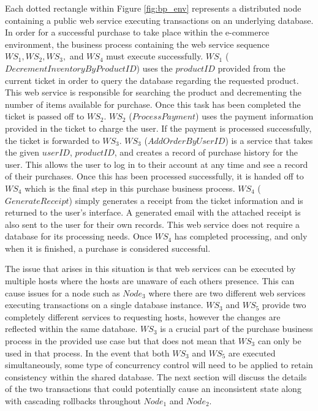 \documentclass[conference]{IEEEtran}
\begin{document}
Each dotted rectangle within Figure \ref{fig:bp_env} represents a distributed node containing a public web service executing transactions on an underlying database. In order for a successful purchase to take place within the e-commerce environment, the business process containing the web service sequence $WS_{1}, WS_{2}, WS_{3},$ and $WS_{4}$ must execute successfully. $WS_{1}$ ($DecrementInventoryByProductID$) uses the $productID$ provided from the current ticket in order to query the database regarding the requested product. This web service is responsible for searching the product and decrementing the number of items available for purchase. Once this task has been completed the ticket is passed off to $WS_{2}$. $WS_{2}$ ($ProcessPayment$) uses the payment information provided in the ticket to charge the user. If the payment is processed successfully, the ticket is forwarded to $WS_{3}$. $WS_{3}$ ($AddOrderByUserID$) is a service that takes the given $userID$, $product ID$, and creates a record of purchase history for the user. This allows the user to log in to their account at any time and see a record of their purchases. Once this has been processed successfully, it is handed off to $WS_{4}$ which is the final step in this purchase business process. $WS_{4}$ ($GenerateReceipt$) simply generates a receipt from the ticket information and is returned to the user's interface. A generated email with the attached receipt is also sent to the user for their own records. This web service does not require a database for its processing needs. Once $WS_{4}$ has completed processing, and only when it is finished, a purchase is considered successful.

The issue that arises in this situation is that web services can be executed by multiple hosts where the hosts are unaware of each others presence. This can cause issues for a node such as $Node_{3}$ where there are two different web services executing transactions on a single database instance. $WS_{3}$ and $WS_{5}$ provide two completely different services to requesting hosts, however the changes are reflected within the same database. $WS_{3}$ is a crucial part of the purchase business process in the provided use case but that does not mean that $WS_{3}$ can only be used in that process. In the event that both $WS_{3}$ and $WS_{5}$ are executed simultaneously, some type of concurrency control will need to be applied to retain consistency within the shared database. The next section will discuss the details of the two transactions that could potentially cause an inconsistent state along with cascading rollbacks throughout $Node_{1}$ and $Node_{2}$.
\end{document}
